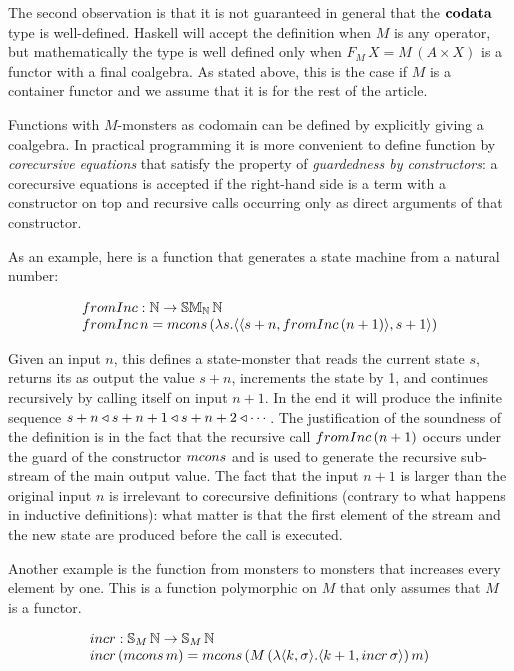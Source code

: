 The second observation is that it is not guaranteed in general that the $\mathbf{codata}$ type is well-defined.
Haskell will accept the definition when $M$ is any operator, but mathematically the type is well defined only when $F_M\,X = M\,(A\times X)$ is a functor with a final coalgebra.
As stated above, this is the case if $M$ is a container functor and we assume that it is for the rest of the article.

Functions with $M$-monsters as codomain can be defined by explicitly giving a coalgebra.
In practical programming it is more convenient to define function by {\em corecursive equations} that satisfy the property of {\em guardedness by constructors}:
a corecursive equations is accepted if the right-hand side is a term with a constructor on top and recursive calls occurring only as direct arguments of that constructor.

As an example, here is a function that generates a state machine from a natural number:

$$
\begin{array}{l}
\frominc : \nat \rightarrow \stmon{\nat}\,\nat \\
\frominc\, n = \mcons\, (\lambda s. \pair{\pair{s+n}{\frominc\, (n + 1)}}{s + 1})
\end{array}
$$

Given an input $n$, this defines a state-monster that reads the current state $s$, returns its as output the value $s+n$, increments the state by 1, and continues recursively by calling itself on input $n+1$.
In the end it will produce the infinite sequence $s+n \triangleleft s+n+1 \triangleleft s+n+2 \triangleleft \cdots$.
The justification of the soundness of the definition is in the fact that the recursive call $\frominc\, (n + 1)$ occurs under the guard of the constructor $\mcons $ and is used to generate the recursive sub-stream of the main output value.
The fact that the input $n+1$ is larger than the original input $n$ is irrelevant to corecursive definitions (contrary to what happens in inductive definitions): what matter is that the first element of the stream and the new state are produced before the call is executed.

Another example is the function from monsters to monsters that increases every element by one.
This is a function polymorphic on $M$ that only assumes that $M$ is a functor.

$$
\begin{array}{l}
\incr : \stream{M}\,\nat \rightarrow \stream{M}\,\nat\\
\incr\,(\mcons\,m) = \mcons\,(M\,(\lambda \pair{k}{\sigma}. \pair{k+1}{\incr\,\sigma})\,m)
\end{array}
$$

